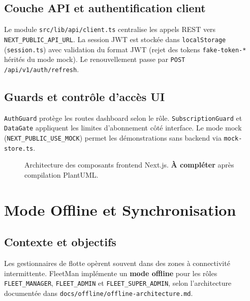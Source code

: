 \documentclass[12pt,a4paper]{report}
\begin{document}
\begin{enumerate}[leftmargin=2cm]
\section{Couche API et authentification client}

Le module \texttt{src/lib/api/client.ts} centralise les appels REST vers
\texttt{NEXT\_PUBLIC\_API\_URL}. La session JWT est stockée dans
\texttt{localStorage} (\texttt{session.ts}) avec validation du format
JWT (rejet des tokens \texttt{fake-token-*} hérités du mode mock).
Le renouvellement passe par \texttt{POST /api/v1/auth/refresh}.

\section{Guards et contrôle d'accès UI}

\texttt{AuthGuard} protège les routes dashboard selon le rôle.
\texttt{SubscriptionGuard} et \texttt{DataGate} appliquent les limites
d'abonnement côté interface. Le mode mock (\texttt{NEXT\_PUBLIC\_USE\_MOCK})
permet les démonstrations sans backend via \texttt{mock-store.ts}.

\begin{figure}[H]
  \centering
  \caption{Architecture des composants frontend Next.js.
           \textbf{À compléter} après compilation PlantUML.}
  \label{fig:frontend_components}
\end{figure}

\chapter{Mode Offline et Synchronisation}

\section{Contexte et objectifs}

Les gestionnaires de flotte opèrent souvent dans des zones à connectivité
intermittente. FleetMan implémente un \textbf{mode offline} pour les rôles
\texttt{FLEET\_MANAGER}, \texttt{FLEET\_ADMIN} et \texttt{FLEET\_SUPER\_ADMIN},
selon l'architecture documentée dans \texttt{docs/offline/offline-architecture.md}.


\end{enumerate}
\end{document}
